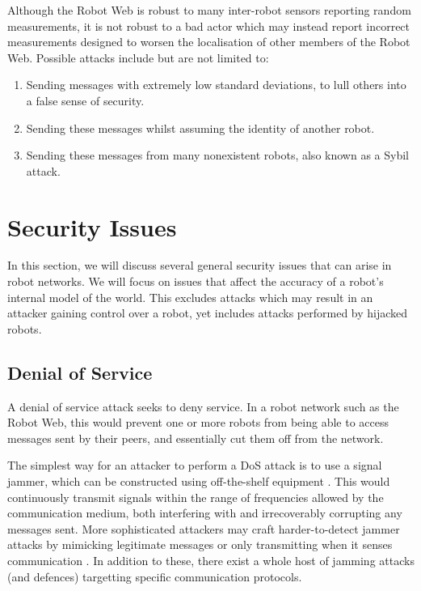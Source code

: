 Although the Robot Web is robust to many inter-robot sensors reporting random measurements, it is not robust to a bad actor which may instead report incorrect measurements designed to worsen the localisation of other members of the Robot Web. Possible attacks include but are not limited to:

\begin{enumerate}
    \item Sending messages with extremely low standard deviations, to lull others into a false sense of security.
    \item Sending these messages whilst assuming the identity of another robot.
    \item Sending these messages from many nonexistent robots, also known as a Sybil attack.
\end{enumerate}

\section{Security Issues}
In this section, we will discuss several general security issues that can arise in robot networks. We will focus on issues that affect the accuracy of a robot's internal model of the world. This excludes attacks which may result in an attacker gaining control over a robot, yet includes attacks performed by hijacked robots.

\subsection{Denial of Service} %
A denial of service attack seeks to deny service. In a robot network such as the Robot Web, this would prevent one or more robots from being able to access messages sent by their peers, and essentially cut them off from the network.

The simplest way for an attacker to perform a DoS attack is to use a signal jammer, which can be constructed using off-the-shelf equipment \cite{SignalJamming}. This would continuously transmit signals within the range of frequencies allowed by the communication medium, both interfering with and irrecoverably corrupting any messages sent. More sophisticated attackers may craft harder-to-detect jammer attacks by mimicking legitimate messages or only transmitting when it senses communication \cite{SignalJamming}. In addition to these, there exist a whole host of jamming attacks (and defences) targetting specific communication protocols.

